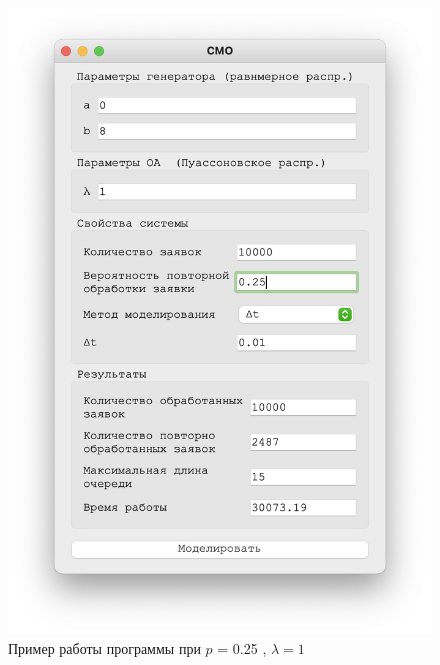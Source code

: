 \begin{figure}[!htb]
\begin{minipage}{0.55\textwidth}
      \includegraphics[width=1\linewidth]{1-25-t}
    \end{minipage}
    \caption{Пример работы программы при $p$ = 0.25 , $\lambda = 1$}
 \end{figure}


